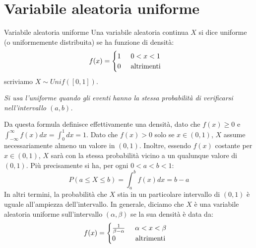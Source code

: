 \section{Variabile aleatoria uniforme}
\begin{Definition}{Variabile aleatoria uniforme}{}
    Una variabile aleatoria continua $X$ si dice uniforme (o uniformemente distribuita) se ha funzione di densità:
    \begin{equation*}
        f(x)=\begin{cases}
            1\hspace{0.5cm}0<x<1\\0\hspace{0.5cm}\mbox{altrimenti}
        \end{cases}
    \end{equation*}
    scriviamo $X\sim Unif([0,1])$.

    \textit{Si usa l'uniforme quando gli eventi hanno la stessa probabilità di verificarsi nell'intervallo $(a,b)$.}
\end{Definition}

Da questa formula definisce effettivamente una densità, dato che $f(x)\geq 0$ e $\int^\infty_{-\infty}f(x)dx=\int^1_0dx=1$. Dato che $f(x)> 0$ solo se $x\in (0,1)$, $X$ assume necessariamente almeno un valore in $(0,1)$. Inoltre, essendo $f(x)$ costante per $x\in (0,1)$, $X$ sarà con la stessa probabilità vicino a un qualunque valore di $(0,1)$. Più precisamente si ha, per ogni $0 < a < b < 1$:
\begin{equation*}
    P(a\leq X\leq b)=\int^b_af(x)dx=b-a
\end{equation*}
In altri termini, la probabilità che $X$ stia in un particolare intervallo di $(0,1)$ è uguale all'ampiezza dell'intervallo. In generale, diciamo che $X$ è una variabile aleatoria uniforme sull'intervallo $(\alpha, \beta)$ se la sua densità è data da:
\begin{equation*}
    f(x)=\begin{cases}
        \frac{1}{\beta-\alpha}\hspace{0.5cm}\alpha<x<\beta\\0\hspace{1cm}\mbox{altrimenti}
    \end{cases}
\end{equation*}

